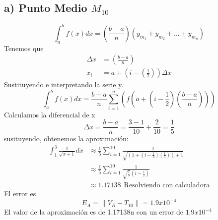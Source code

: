 \documentclass[11pt,letterpaper]{article}
\begin{document}
\subsection*{a) Punto Medio $M_{10}$}
\begin{equation*}
  \int_a^b f(x)dx=\left( \frac{b-a}{n}\right)\left( y_{m_1}+y_{m_2}+...+y_{m_n}\right)
\end{equation*}
Tenemos que
\begin{equation*}
  \begin{split}
    \Delta x &= \left( \frac{b-a}{n} \right)\\
    x_i &= a+(i-(\frac{1}{2}))\Delta x
  \end{split}
\end{equation*}
Sustituyendo e interpretando la serie y.
\begin{equation*}
    \int_a^b f(x)dx = \frac{b-a}{n}\sum_{i=1}^n\left(f\left( a+(i-\frac{1}{2})(\frac{b-a}{n}) \right)\right)
\end{equation*}
Calculamos la diferencial de x
\begin{equation*}
  \Delta x = \frac{b-a}{n} = \frac{3-1}{10}+\frac{2}{10}=\frac{1}{5}
\end{equation*}
susituyendo, obtenemos la aproximación:
\begin{equation*}
  \begin{split}
    \int_1^3 \frac{1}{\sqrt{x+1}}dx &\approx \frac{1}{5}\sum_{i=1}^{10}\frac{1}{\sqrt{(1+(i-\frac{1}{2})(\frac{1}{5}))+1}}\\
    &\approx \frac{1}{5}\sum_{i=1}^{10}\frac{1}{\sqrt{\frac{1}{5}}(i-\frac{i}{2})}\\
    &\approx 1.17138 \ \ \text{Resolviendo con calculadora}
  \end{split}
\end{equation*}
El error es
\begin{equation*}
    E_A=\|V_R-T_{10} \|=1.9x10^{-4}
\end{equation*}
El valor de la aproximación es de 1.17138u con un error de $1.9x10^{-4}$
\end{document}
